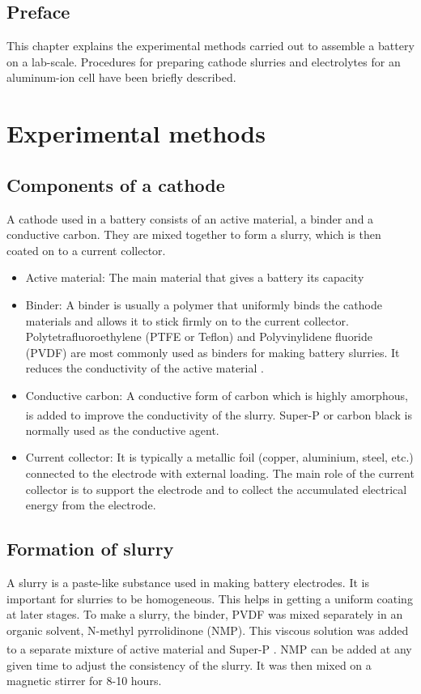 \section*{\centering Preface}
This chapter explains the experimental methods carried out to assemble a battery on a lab-scale. Procedures for preparing cathode slurries and electrolytes for an aluminum-ion cell have been briefly described. 
\pagebreak
\chapter{Experimental methods} %

\label{chap3} %

\section{Components of a cathode}
A cathode used in a battery consists of an active material, a binder and a conductive carbon. They are mixed together to form a slurry, which is then coated on to a current collector.  
\begin{itemize}
    \item Active material: The main material that gives a battery its capacity
    \item Binder: A binder is usually a polymer that uniformly binds the cathode materials and allows it to stick firmly on to the current collector. Polytetrafluoroethylene (PTFE or Teflon) and Polyvinylidene fluoride (PVDF) are most commonly used as binders for making battery slurries. It reduces the conductivity of the active  material \cite{grillet_conductivity_2016}. 
    \item Conductive carbon: A conductive form of carbon which is highly amorphous, is added to improve the conductivity of the slurry. Super-P\textsuperscript{\textregistered} or carbon black is normally used as the conductive agent. 
    \item Current collector: It is typically a metallic foil (copper, aluminium, steel, etc.) connected to the electrode with external loading. The main role of the current collector is to support the electrode and to collect the accumulated electrical energy from the electrode\cite{sun_effect_2017}.
\end{itemize}

\section{Formation of slurry}
A slurry is a paste-like substance used in making battery electrodes. It is important for slurries to be homogeneous. This helps in getting a uniform coating at later stages. To make a slurry, the binder, PVDF was mixed separately in an organic solvent, N-methyl pyrrolidinone (NMP). This viscous solution was added to a separate mixture of active material and Super-P\textsuperscript{\textregistered} . NMP can be added at any given time to adjust the consistency of the slurry. It was then mixed on a magnetic stirrer for 8-10 hours. 

